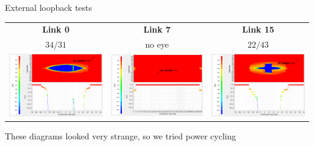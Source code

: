 \documentclass[aspectratio=169]{beamer}
\begin{document}
\begin{frame}{External loopback tests}
\centering

	\begin{tabular}{c c c}
	\textbf{Link 0} & \textbf{Link 7} & \textbf{Link 15} \\[.25cm]
		$34 / 31$ & no eye & $22 / 43$ \\[.25cm]
		\includegraphics[width=.3\textwidth]{fig/2021-02-15_10g_prbs7_link0.png} &
		\includegraphics[width=.3\textwidth]{fig/2021-02-15_10g_prbs7_link7.png} &
		\includegraphics[width=.3\textwidth]{fig/2021-02-15_10g_prbs7_link15.png}
	\end{tabular}
	
	\vspace{0.5cm}
	
	These diagrams looked very strange, so we tried power cycling

\end{frame}
\end{document}
